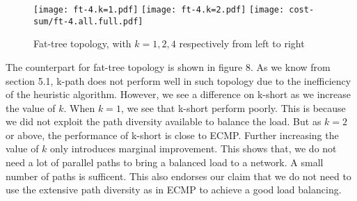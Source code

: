 \documentclass[conference]{IEEEtran}
\begin{document}
\begin{figure*}
\texttt{[image: ft-4.k=1.pdf]}%
\texttt{[image: ft-4.k=2.pdf]}%
\texttt{[image: cost-sum/ft-4.all.full.pdf]}
\caption{Fat-tree topology, with $k=1,2,4$ respectively from left to right}
\end{figure*}

The counterpart for fat-tree topology is shown in figure 8. As we know from
section 5.1, k-path does not perform well in such topology due to the
inefficiency of the heuristic algorithm. However, we see a difference on
k-short as we increase the value of $k$. When $k=1$, we see that k-short
perform poorly. This is because we did not exploit the path diversity available
to balance the load. But as $k=2$ or above, the performance of k-short is close
to ECMP. Further increasing the value of $k$ only introduces marginal
improvement. This shows that, we do not need a lot of parallel paths to bring a
balanced load to a network. A small number of paths is sufficent. This also
endorses our claim that we do not need to use the extensive path diversity as
in ECMP to achieve a good load balancing.

\balance



\label{docend}
\end{document}
